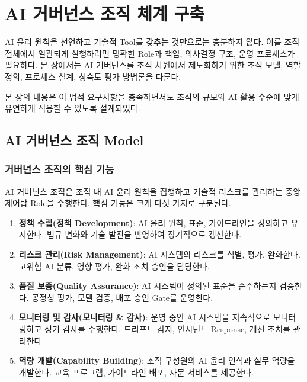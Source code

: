 
\chapter{AI 거버넌스 조직 체계 구축}
\label{ch:governance_organization}

AI 윤리 원칙을 선언하고 기술적 Tool를 갖추는 것만으로는 충분하지 않다. 
이를 조직 전체에서 일관되게 실행하려면 
명확한 Role과 책임, 의사결정 구조, 운영 프로세스가 필요하다.\cite{mantymaki2022defining} 
본 장에서는 AI 거버넌스를 조직 차원에서 제도화하기 위한 
조직 모델, 역할 정의, 프로세스 설계\cite{schneider2022governance}, 성숙도\cite{cmmi2018model} 평가 방법론을 다룬다.\cite{cihon2021ai}

본 장의 내용은 이 법적 요구사항을 충족하면서도 조직의 규모와 AI 활용 수준에 맞게 유연하게 적용할 수 있도록 설계되었다.\cite{davenport2018artificial}


\section{AI 거버넌스 조직 Model}
\label{sec:4.1}

\subsection{거버넌스 조직의 핵심 기능}
\label{sec:4.1.1}

AI 거버넌스 조직은 조직 내 AI 윤리 원칙을 집행하고 기술적 리스크를 관리하는 중앙 제어탑 Role을 수행한다.\cite{ibm2020governance} 핵심 기능은 크게 다섯 가지로 구분\cite{enholm2022artificial}된다.

\begin{enumerate}
 \item \textbf{정책 수립(정책 Development)}: 
 AI 윤리 원칙, 표준, 가이드라인을 정의하고 유지한다. 
 법규 변화와 기술 발전을 반영하여 정기적으로 갱신한다.
 
 \item \textbf{리스크 관리(Risk Management\cite{nist2023airmf})}: 
 AI 시스템의 리스크를 식별, 평가, 완화한다. 
 고위험 AI 분류, 영향 평가, 완화 조치 승인을 담당한다.
 
 \item \textbf{품질 보증(Quality Assurance)}: 
 AI 시스템이 정의된 표준을 준수하는지 검증한다. 
 공정성 평가, 모델 검증, 배포 승인 Gate를 운영한다.
 
 \item \textbf{모니터링 및 감사(모니터링 \& 감사)}: 
 운영 중인 AI 시스템을 지속적으로 모니터링하고 정기 감사를 수행한다. 
 드리프트 감지, 인시던트 Response, 개선 조치를 관리한다.
 
 \item \textbf{역량 개발(Capability Building)}: 
 조직 구성원의 AI 윤리 인식과 실무 역량을 개발\cite{mikalef2022thinking}한다. 
 교육 프로그램, 가이드라인 배포, 자문 서비스를 제공\cite{vakkuri2020current}한다.
\end{enumerate}



